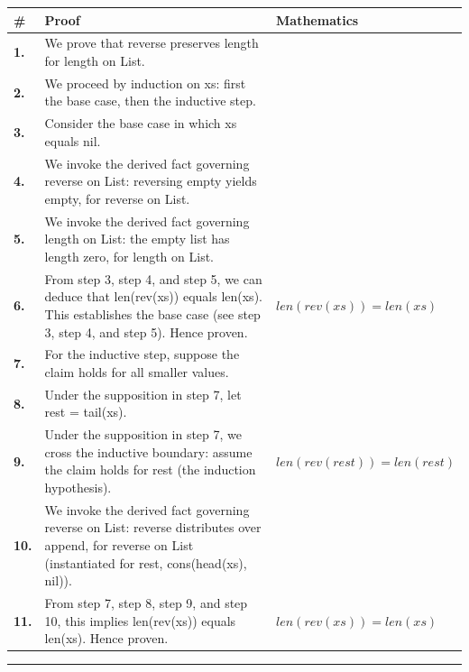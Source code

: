 \documentclass[11pt]{article}
\theoremstyle{definition}
\begin{document}
\begin{tabular}{@{} >{\raggedright\arraybackslash}p{} >{\raggedright\arraybackslash}p{} >{\raggedleft\arraybackslash}p{} @{}}
\textbf{\#} & \textbf{Proof} & \textbf{Mathematics} \\
\midrule
\textbf{1.} & We prove that reverse preserves length for length on List. & \\[0.45em]
\textbf{2.} & We proceed by induction on xs: first the base case, then the inductive step. & \\[0.45em]
\textbf{3.} & Consider the base case in which xs  equals  nil. & \\[0.45em]
\textbf{4.} & We invoke the derived fact governing reverse on List: reversing empty yields empty, for reverse on List. & \\[0.45em]
\textbf{5.} & We invoke the derived fact governing length on List: the empty list has length zero, for length on List. & \\[0.45em]
\textbf{6.} & From step 3, step 4, and step 5, we can deduce that len(rev(xs)) equals len(xs). This establishes the base case (see step 3, step 4, and step 5). Hence proven. & $\displaystyle len(rev(xs)) = len(xs)$ \\[0.45em]
\textbf{7.} & For the inductive step, suppose the claim holds for all smaller values. & \\[0.45em]
\textbf{8.} & Under the supposition in step 7, let rest = tail(xs). & \\[0.45em]
\textbf{9.} & Under the supposition in step 7, we cross the inductive boundary: assume the claim holds for rest (the induction hypothesis). & $\displaystyle len(rev(rest)) = len(rest)$ \\[0.45em]
\textbf{10.} & We invoke the derived fact governing reverse on List: reverse distributes over append, for reverse on List (instantiated for rest, cons(head(xs), nil)). & \\[0.45em]
\textbf{11.} & From step 7, step 8, step 9, and step 10, this implies len(rev(xs)) equals len(xs). Hence proven. & $\displaystyle len(rev(xs)) = len(xs)$ \\[0.45em]
\bottomrule
\end{tabular}
\label{thm:List-length-reverse_preserves_length}
\par\medskip\hrule
\end{document}
